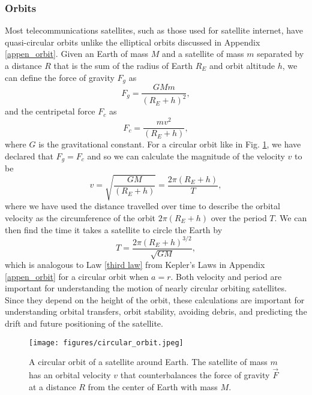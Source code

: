 \documentclass[10pt]{article}
\begin{document}
\subsubsection{Orbits}
\label{orbits}

Most telecommunications satellites, such as those used for satellite internet, have quasi-circular orbits unlike the elliptical orbits discussed in Appendix \ref{appen_orbit}. Given an Earth of mass $M$ and a satellite of mass $m$ separated by a distance $R$ that is the sum of the radius of Earth $R_E$ and orbit altitude $h$, we can define the force of gravity $F_g$ as
\begin{equation}
F_g = \frac{GMm}{(R_E + h)^2},
    \label{eq:gravity}
\end{equation}
and the centripetal force $F_c$ as
\begin{equation}
F_c = \frac{mv^2}{(R_E + h)},
    \label{eq:centripetal}
\end{equation}
where $G$ is the gravitational constant. For a circular orbit like in Fig. \ref{fig:centrifugal}, we have declared that $F_g = F_c$ and so we can calculate the magnitude of the velocity $v$ to be 
\begin{equation}
v = \sqrt{\frac{GM}{(R_E + h)}} = \frac{2\pi (R_E + h)}{T},
    \label{eq:velocity}
\end{equation}
where we have used the distance travelled over time to describe the orbital velocity as the circumference of the orbit $2\pi (R_E + h)$ over the period $T$. We can then find the time it takes a satellite to circle the Earth by
\begin{equation}
T = \frac{2\pi (R_E + h)^{3/2}}{\sqrt{GM}},
    \label{eq:period}
\end{equation}
which is analogous to Law \ref{third law} from Kepler's Laws in Appendix \ref{appen_orbit} for a circular orbit when $a = r$. Both velocity and period are important for understanding the motion of nearly circular orbiting satellites. Since they depend on the height of the orbit, these calculations are important for understanding orbital transfers, orbit stability, avoiding debris, and predicting the drift and future positioning of the satellite.

\begin{figure}[h!]
\centering
\texttt{[image: figures/circular\_orbit.jpeg]}
\caption{A circular orbit of a satellite around Earth. The satellite of mass $m$ has an orbital velocity $v$ that counterbalances the force of gravity $\vec{F}$ at a distance $R$ from the center of Earth with mass $M$\cite{circular_orbit}.}
\label{fig:centrifugal}
\end{figure}
\end{document}
